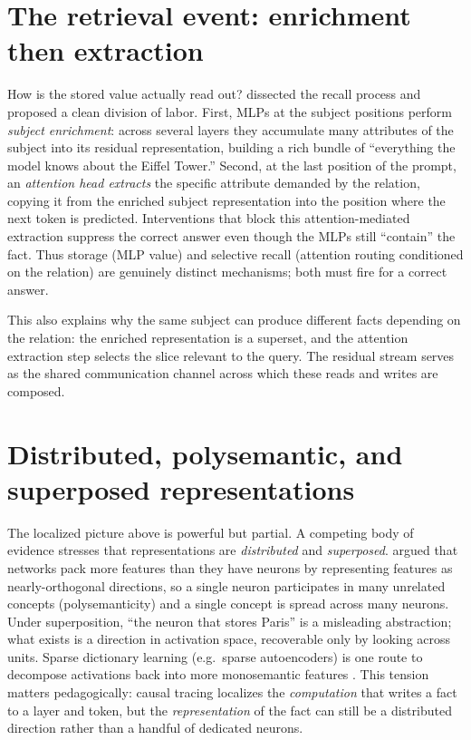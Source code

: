 \documentclass[11pt]{article}
\begin{document}
\section{The retrieval event: enrichment then extraction}
How is the stored value actually read out? \citet{geva2023dissecting} dissected the recall process and proposed a clean division of labor. First, MLPs at the subject positions perform \emph{subject enrichment}: across several layers they accumulate many attributes of the subject into its residual representation, building a rich bundle of ``everything the model knows about the Eiffel Tower.'' Second, at the last position of the prompt, an \emph{attention head extracts} the specific attribute demanded by the relation, copying it from the enriched subject representation into the position where the next token is predicted. Interventions that block this attention-mediated extraction suppress the correct answer even though the MLPs still ``contain'' the fact. Thus storage (MLP value) and selective recall (attention routing conditioned on the relation) are genuinely distinct mechanisms; both must fire for a correct answer.

This also explains why the same subject can produce different facts depending on the relation: the enriched representation is a superset, and the attention extraction step selects the slice relevant to the query. The residual stream serves as the shared communication channel \citep{elhage2021mathematical} across which these reads and writes are composed.

\section{Distributed, polysemantic, and superposed representations}
The localized picture above is powerful but partial. A competing body of evidence stresses that representations are \emph{distributed} and \emph{superposed}. \citet{elhage2022superposition} argued that networks pack more features than they have neurons by representing features as nearly-orthogonal directions, so a single neuron participates in many unrelated concepts (polysemanticity) and a single concept is spread across many neurons. Under superposition, ``the neuron that stores Paris'' is a misleading abstraction; what exists is a direction in activation space, recoverable only by looking across units. Sparse dictionary learning (e.g.\ sparse autoencoders) is one route to decompose activations back into more monosemantic features \citep{cunningham2023sparse}. This tension matters pedagogically: causal tracing localizes the \emph{computation} that writes a fact to a layer and token, but the \emph{representation} of the fact can still be a distributed direction rather than a handful of dedicated neurons.
\end{document}
